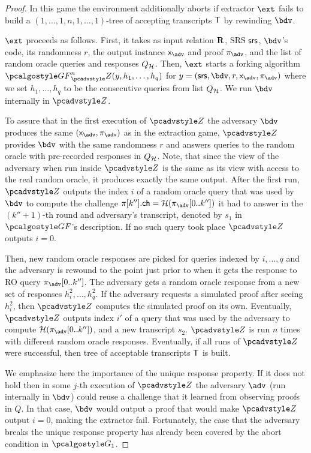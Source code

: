 \begin{proof}
In this game the environment additionally aborts if extractor $\ext$ fails to build a
$(1, \ldots, 1, n, 1, \ldots, 1)$-tree of accepting transcripts $\mathsf{T}$ by rewinding
$\bdv$.

$\ext$ proceeds as follows. First, it takes as input relation $\mathbf{R}$, SRS $\mathsf{srs}$,
$\bdv$'s code, its randomness $r$, the output instance $\inp_{\advse}$ and proof
$\zkproof_{\advse}$, and the list of random oracle queries and responses
$Q_{\mathcal{H}}$. Then, $\ext$ starts a forking algorithm
$\genforking^{n}_\zdv(y,h_1, \ldots, h_q)$ for
$y = (\srs, \bdv, r, \inp_{\advse}, \zkproof_{\advse})$ where we set
$h_1, \ldots, h_q$ to be the consecutive queries from list $Q_{\mathcal{H}}$. We run $\bdv$
internally in $\zdv$.
		
To assure that in the first execution of $\zdv$ the adversary $\bdv$ produces the
same $(\inp_{\advse}, \zkproof_{\advse})$ as in the extraction game, $\zdv$ provides
$\bdv$ with the same randomness $r$ and answers queries to the random oracle with
pre-recorded responses in $Q_{\mathcal{H}}$.
Note, that since the view of the adversary when run inside $\zdv$ is the same as its
view with access to the real random oracle, it produces exactly the same
output. After the first run, $\zdv$ outputs the index $i$ of a random oracle query
that was used by $\bdv$ to compute the challenge
$\zkproof[k''].\ch = \ro(\zkproof_{\advse}[0..k''])$ it had to answer in the $(k'' + 1)$-th
round and adversary's transcript, denoted by $s_1$ in $\genforking$'s description. If
no such query took place $\zdv$ outputs $i = 0$.
		
Then, new random oracle responses are picked for queries indexed by $i, \ldots, q$
and the adversary is rewound to the point just prior to when it gets the response to
RO query $\zkproof_{\advse}[0..k'']$. The adversary gets a random oracle response from
a new set of responses $h^2_i, \ldots, h^2_q$. If the adversary requests a simulated
proof after seeing $h^2_i$, then $\zdv$ computes the simulated proof on its
own. Eventually, $\zdv$ outputs index $i'$ of a query that was used by the adversary
to compute $\ro(\zkproof_{\advse}[0..k''])$, and a new transcript $s_2$. $\zdv$ is run
$n$ times with different random oracle responses.  Eventually, if all runs of $\zdv$
were successful, then tree of acceptable transcripts $\mathsf{T}$ is built.
		
We emphasize here the importance of the unique response property. If it does not hold
then in some $j$-th execution of $\zdv$ the adversary $\adv$ (run internally in
$\bdv$) could reuse a challenge that it learned from observing proofs in $Q$. In that
case, $\bdv$ would output a proof that would make $\zdv$ output $i = 0$, making the
extractor fail. Fortunately, the case that the adversary breaks the unique response
property has already been covered by the abort condition in $\game{1}$.
		

\end{proof}

